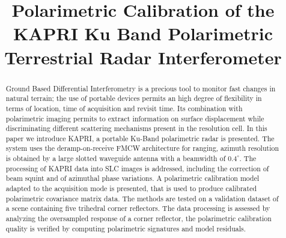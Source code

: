 \documentclass[12pt]{IEEEtran}
\title{Polarimetric Calibration of the KAPRI Ku Band Polarimetric Terrestrial Radar Interferometer}
\author{\IEEEauthorblockN{
	Simone Baffelli\IEEEauthorrefmark{1},
	Othmar Frey\IEEEauthorrefmark{2},
	Charles Werner\IEEEauthorrefmark{3}
	Irena Hajnsek\IEEEauthorrefmark{4}
}}
\begin{document}
\maketitle
\begin{abstract}
Ground Based Differential Interferometry is a precious tool to monitor fast changes in natural terrain; the use of portable devices permits an high degree of flexibility in terms of location, time of acquisition and revisit time. Its combination with polarimetric imaging permits to extract information on surface displacement while discriminating different scattering mechanisms present in the resolution cell.
In this paper we introduce KAPRI, a portable Ku-Band polarimetric radar is presented. The system uses the deramp-on-receive FMCW architecture for ranging, azimuth resolution is obtained by a large slotted waveguide antenna with a beamwidth of $0.4^\circ$. The processing of KAPRI data into SLC images is addressed, including the correction of beam squint and of azimuthal phase variations. A polarimetric calibration model adapted to the acquisition mode is presented, that is used to produce calibrated polarimetric covariance matrix data. The methods are tested on a validation dataset of a scene containing five trihedral corner reflectors. The data processing is assessed by analyzing the oversampled response of a corner reflector, the polarimetric calibration quality is verified by computing polarimetric signatures and model residuals.
\end{abstract}






\end{document}

